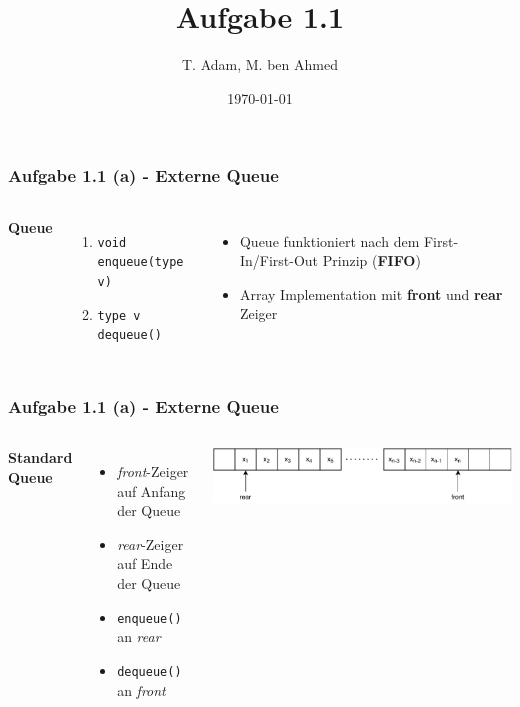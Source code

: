\documentclass[aspectratio=169]{beamer}
\title[Aufgabe 1.1]{Aufgabe 1.1} %
\author{T. Adam, M. ben Ahmed} %
\institute[UOS] %
{

Universität Osnabrück \\ %

\medskip
\textit{Algorithm Engineering} %


}
\date{\today} %
\begin{document}
\begin{frame}
\titlepage %
\end{frame}





\begin{frame}
	\frametitle{Aufgabe 1.1 (a) - Externe Queue}
	\begin{columns}[c] %
	
	\textbf{Queue}
	\begin{enumerate}
	\item \texttt{void enqueue(type v)}
	\item \texttt{type v dequeue()}
	\end{enumerate}
	
	\begin{itemize}
		\item Queue funktioniert nach dem First-In/First-Out Prinzip (\textbf{FIFO})
		\item Array Implementation mit \textbf{front} und \textbf{rear} Zeiger
	\end{itemize}
	
	\end{columns}
	\end{frame}


\begin{frame}
	\frametitle{Aufgabe 1.1 (a) - Externe Queue}
	\begin{columns}[c] %
	
	\textbf{Standard Queue}
	\begin{itemize}
		\item \emph{front}-Zeiger auf Anfang der Queue
		\item \emph{rear}-Zeiger auf Ende der Queue
		\item \texttt{enqueue()} an \emph{rear}
		\item \texttt{dequeue()} an \emph{front}
	\end{itemize}
	
	\includegraphics[scale=.5]{queue0.pdf}
	
	\end{columns}
	\end{frame}
\end{document}
